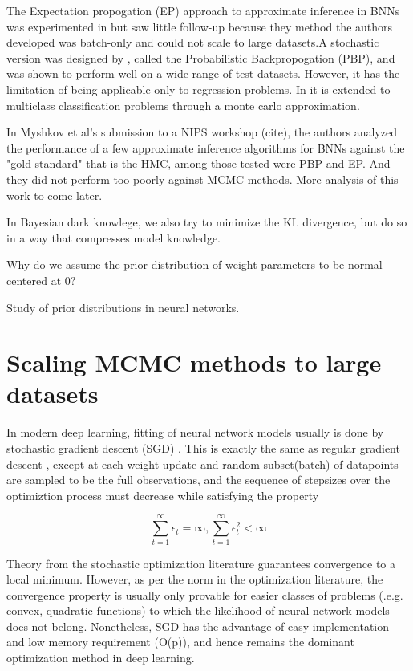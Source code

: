 \documentclass{book}
\begin{document}
\begin{enumerate}
The Expectation propogation (EP) approach to approximate inference in BNNs was experimented in \cite{jylanki2014expectation} but saw little follow-up because they method the authors developed was batch-only and could not scale to large datasets.A stochastic version was designed by \cite{hernandez2015probabilistic}, called the Probabilistic Backpropogation (PBP), and was shown to perform well on a wide range of test datasets. However, it has the limitation of being applicable only to regression problems. In \cite{ghosh2016assumed} it is extended to multiclass classification problems through a monte carlo approximation. 

In Myshkov et al's submission to a NIPS workshop (cite), the authors analyzed the performance of a few approximate inference algorithms for BNNs against the "gold-standard" that is the HMC, among those tested were PBP and EP. And they did not perform too poorly against MCMC methods. More analysis of this work to come later.  

In Bayesian dark knowlege, we also try to minimize the KL divergence, but do so
in a way that compresses model knowledge.  

Why do we assume the prior distribution of weight parameters to be normal centered at 0?

Study of prior distributions in neural networks.\cite{lampinen2001bayesian,titterington2004bayesian}

\section{Scaling MCMC methods to large datasets}

In modern deep learning, fitting of neural network models usually is done by stochastic gradient descent (SGD) \cite{ngiam2011optimization}.
This is exactly the same as regular gradient descent \cite{wright1999numerical}, except at each weight update and random subset(batch) of datapoints are sampled to be the full observations, and the sequence of stepsizes over the optimiztion process must decrease while satisfying the property

\[ \sum_{t=1}^\infty \epsilon_t = \infty , \sum_{t=1}^\infty \epsilon_t^2 < \infty \]

Theory from the stochastic optimization literature \cite{robbins1951stochastic} guarantees convergence to a local minimum. However, as per the norm in the optimization literature, the convergence property is usually only provable for easier classes of problems (.e.g. convex, quadratic functions) to which the likelihood of neural network models does not belong. Nonetheless, SGD has the advantage of easy implementation and low memory requirement (O(p)), and hence remains the dominant optimization method in deep learning.  


\end{enumerate}
\end{document}
